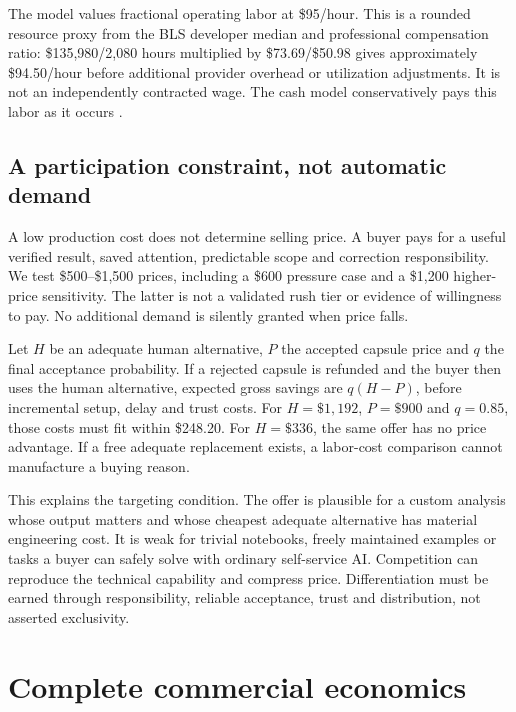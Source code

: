 The model values fractional operating labor at \$95/hour. This is a rounded resource proxy from the BLS developer median and professional compensation ratio: \$135,980/2,080 hours multiplied by \$73.69/\$50.98 gives approximately \$94.50/hour before additional provider overhead or utilization adjustments. It is not an independently contracted wage. The cash model conservatively pays this labor as it occurs \citep{blswage,blsecec}.

\subsection{A participation constraint, not automatic demand}
A low production cost does not determine selling price. A buyer pays for a useful verified result, saved attention, predictable scope and correction responsibility. We test \$500--\$1,500 prices, including a \$600 pressure case and a \$1,200 higher-price sensitivity. The latter is not a validated rush tier or evidence of willingness to pay. No additional demand is silently granted when price falls.

Let $H$ be an adequate human alternative, $P$ the accepted capsule price and $q$ the final acceptance probability. If a rejected capsule is refunded and the buyer then uses the human alternative, expected gross savings are $q(H-P)$, before incremental setup, delay and trust costs. For $H=\$1,192$, $P=\$900$ and $q=0.85$, those costs must fit within \$248.20. For $H=\$336$, the same offer has no price advantage. If a free adequate replacement exists, a labor-cost comparison cannot manufacture a buying reason.

This explains the targeting condition. The offer is plausible for a custom analysis whose output matters and whose cheapest adequate alternative has material engineering cost. It is weak for trivial notebooks, freely maintained examples or tasks a buyer can safely solve with ordinary self-service AI. Competition can reproduce the technical capability and compress price. Differentiation must be earned through responsibility, reliable acceptance, trust and distribution, not asserted exclusivity.

\section{Complete commercial economics}
